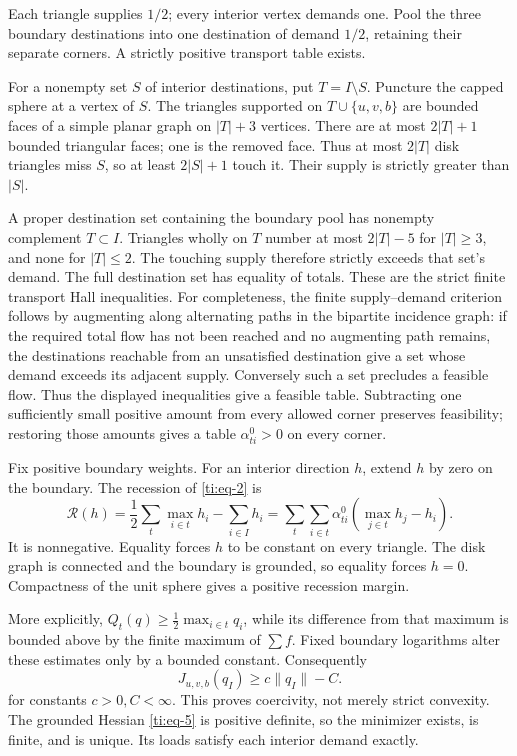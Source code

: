\documentclass[11pt]{article}
\numberwithin{equation}{section}
\theoremstyle{definition}\newtheorem{definition}[theorem]{Definition}
\theoremstyle{remark}\newtheorem{remark}[theorem]{Remark}
\begin{document}
Each triangle supplies \(1/2\); every interior vertex demands one. Pool the three boundary destinations into one destination of demand \(1/2\), retaining their separate corners. A strictly positive transport table exists.

For a nonempty set \(S\) of interior destinations, put \(T=I\setminus S\). Puncture the capped sphere at a vertex of \(S\). The triangles supported on \(T\cup\{u,v,b\}\) are bounded faces of a simple planar graph on \(|T|+3\) vertices. There are at most \(2|T|+1\) bounded triangular faces; one is the removed face. Thus at most \(2|T|\) disk triangles miss \(S\), so at least \(2|S|+1\) touch it. Their supply is strictly greater than \(|S|\).

A proper destination set containing the boundary pool has nonempty complement \(T\subset I\). Triangles wholly on \(T\) number at most \(2|T|-5\) for \(|T|\ge3\), and none for \(|T|\le2\). The touching supply therefore strictly exceeds that set's demand. The full destination set has equality of totals. These are the strict finite transport Hall inequalities. For
completeness, the finite supply--demand criterion follows by augmenting
along alternating paths in the bipartite incidence graph: if the
required total flow has not been reached and no augmenting path remains,
the destinations reachable from an unsatisfied destination give a set
whose demand exceeds its adjacent supply. Conversely such a set
precludes a feasible flow. Thus the displayed inequalities give a
feasible table. Subtracting one sufficiently small positive amount from every allowed corner preserves feasibility; restoring those amounts gives a table \(\alpha^0_{ti}>0\) on every corner.

Fix positive boundary weights. For an interior direction \(h\), extend \(h\) by zero on the boundary. The recession of \eqref{ti:eq-2} is
\begin{equation}\label{ti:eq-6}
\mathcal R(h)=\frac12\sum_t\max_{i\in t}h_i-\sum_{i\in I}h_i
=\sum_t\sum_{i\in t}\alpha^0_{ti}
                  \left(\max_{j\in t}h_j-h_i\right).
\end{equation}
It is nonnegative. Equality forces \(h\) to be constant on every triangle. The disk graph is connected and the boundary is grounded, so equality forces \(h=0\). Compactness of the unit sphere gives a positive recession margin.

More explicitly, \(Q_t(q)\ge\frac12\max_{i\in t}q_i\), while its difference from that maximum is bounded above by the finite maximum of \(\sum f\). Fixed boundary logarithms alter these estimates only by a bounded constant. Consequently
\begin{equation}\label{ti:eq-7}
J_{u,v,b}(q_I)\ge c\lVert q_I\rVert-C.
\end{equation}
for constants \(c>0,C<\infty\). This proves coercivity, not merely strict convexity. The grounded Hessian \eqref{ti:eq-5} is positive definite, so the minimizer exists, is finite, and is unique. Its loads satisfy each interior demand exactly.
\end{document}
